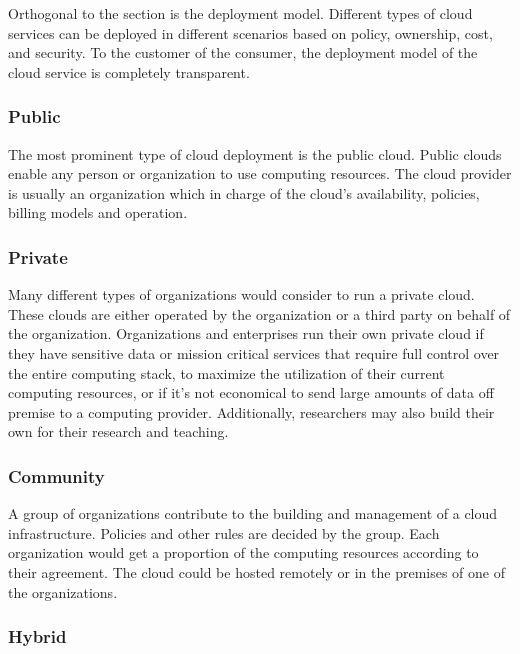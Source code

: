\documentclass[fullapage,12pt]{article}
\begin{document}
Orthogonal to the  section is the deployment model. Different types of cloud services can be deployed in different scenarios based on policy, ownership, cost, and security. To the customer of the consumer, the deployment model of the cloud service is completely transparent.

\subsubsection{Public} \label{ssub:deploy-public}

The most prominent type of cloud deployment is the public cloud. Public clouds enable any person or organization to use computing resources. The cloud provider is usually an organization which in charge of the cloud's availability, policies, billing models and operation.


\subsubsection{Private} \label{ssub:deploy-private}

Many different types of organizations would consider to run a private cloud. These clouds are either operated by the organization or a third party on behalf of the organization. Organizations and enterprises run their own private cloud if they have sensitive data or mission critical services that require full control over the entire computing stack, to maximize the utilization of their current computing resources, or if it's not economical to send large amounts of data off premise to a computing provider. Additionally, researchers may also build their own for their research and teaching.


\subsubsection{Community} \label{ssub:deploy-community}

A group of organizations contribute to the building and management of a cloud infrastructure. Policies and other rules are decided by the group. Each organization would get a proportion of the computing resources according to their agreement. The cloud could be hosted remotely or in the premises of one of the organizations.



\subsubsection{Hybrid} \label{ssub:deploy-hybrid}
\end{document}
